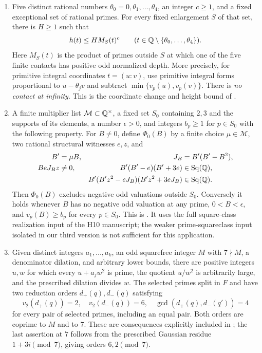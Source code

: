 \begin{enumerate}[label=(\roman*)]
\item Five distinct rational numbers $\theta_0=0,\theta_1,\ldots,\theta_4$,
an integer $c\ge1$, and a fixed exceptional set of rational primes.
For every fixed enlargement $S$ of that set, there is $H\ge1$ such that
\begin{equation}\label{sd:height}
 h(t)\le H M_S(t)^c \qquad
 (t\in\mathbb Q\setminus\{\theta_0,\ldots,\theta_4\}).
\end{equation}
Here $M_S(t)$ is the product of primes outside $S$ at which one of the
five finite contacts has positive odd normalized depth. More precisely,
for primitive integral coordinates $t=(u:v)$, use primitive integral
forms proportional to $u-\theta_jv$ and subtract
$\min\{v_p(u),v_p(v)\}$. There is \emph{no contact at infinity}.
This is the coordinate change and height bound of
\cite[Section~2.3]{Sun2026}.

\item A finite multiplier list $\mathcal M\subset\mathbb Q^\times$, a fixed set
$S_0$ containing $2,3$ and the supports of its elements, a number
$\epsilon>0$, and integers $b_p\ge1$ for $p\in S_0$ with the following
property. For $B\ne0$, define $\Phi_0(B)$ by a finite choice
$\mu\in\mathcal M$, two rational structural witnesses $e,z$, and
\begin{align}
 B'&=\mu B,& J_B&=B'(B'-B^2),\\
 BeJ_Bz&\ne0,&
 B'(B'-e)(B'+3e)&\in\operatorname{Sq}(\mathbb Q),\\
 &&B'(B'z^2-eJ_B)(B'z^2+3eJ_B)&\in\operatorname{Sq}(\mathbb Q).
 \label{sd:phi}
\end{align}
Then $\Phi_0(B)$ excludes negative odd valuations outside $S_0$.
Conversely it holds whenever $B$ has no negative odd valuation at any
prime, $0<B<\epsilon$, and $v_p(B)\ge b_p$ for every $p\in S_0$.
This is \cite[Proposition~2.3]{Sun2026}. It uses the full square-class
realization input of the H10 manuscript; the weaker prime-squareclass
input isolated in our third version is not sufficient for this application.

\item Given distinct integers $a_1,\ldots,a_k$, an odd squarefree integer
$M$ with $7\nmid M$, a denominator dilation, and arbitrary lower bounds,
there are positive integers $u,w$ for which every $u+a_jw^2$ is prime,
the quotient $u/w^2$ is arbitrarily large, and the prescribed dilation
divides $w$. The selected primes split in $F$ and have two reduction orders
$d_+(q),d_-(q)$ satisfying
\begin{equation}\label{sd:orders}
 v_2(d_+(q))=2,\quad v_2(d_-(q))=6,\quad
 \gcd(d_+(q),d_-(q'))=4
\end{equation}
for every pair of selected primes, including an equal pair. Both orders
are coprime to $M$ and to $7$. These are consequences explicitly included
in \cite[Theorem~4.1]{Sun2026}; the last assertion at $7$ follows from
the prescribed Gaussian residue $1+3i\pmod7$, giving orders $6,2\pmod7$.
\end{enumerate}

